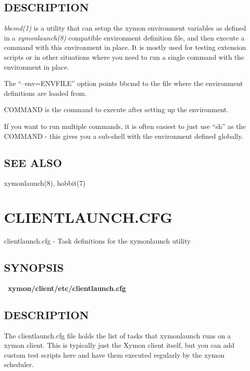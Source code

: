  
\subsection{DESCRIPTION}
\emph{bbcmd(1)} is a utility that can setup the xymon environment
variables as defined in a \emph{xymonlaunch(8)} compatible
environment definition file, and then execute a command with this
environment in place. It is mostly used for testing extension scripts
or in other situations where you need to run a single command with the
environment in place. 


The ``--env=ENVFILE'' option points bbcmd to the file where the
environment definitions are loaded from. 



COMMAND is the command to execute after setting up the environment. 

If you want to run multiple commands, it is often easiest to just use
``sh'' as the COMMAND - this gives you a sub-shell with the
environment defined globally. 

\subsection{SEE ALSO} xymonlaunch(8), hobbit(7) 



%
\newpage
\section{CLIENTLAUNCH.CFG}
 clientlaunch.cfg - Task definitions for the xymonlaunch utility 

 
\subsection{SYNOPSIS}
\textbf{~xymon/client/etc/clientlaunch.cfg}


 
\subsection{DESCRIPTION}
 The clientlaunch.cfg file holds the list of tasks that xymonlaunch
 runs on a xymon client. This is typically just the Xymon client
 itself, but you can add custom test scripts here and have them
 executed regularly by the xymon scheduler. 


